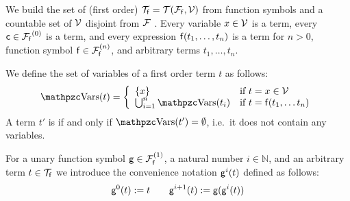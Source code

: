 
\begin{definition}\label{def:terms}
	We build the set of (first order) \( \mcTf = \mcTFfV \)
	from function symbols and a
	countable set of \( \mcV \) disjoint from \( \mcF \) \!.
	Every variable \( x\in\mcV \) is a term,
	every  \( \mc\in\mcFf^{(0)} \) is a term,
	and every expression \( \mf(t_1,\ldots,t_n) \) is a term
	for \( n>0 \), function symbol \( \mf\in\mcFfn \),
	and arbitrary terms \( t_1,\ldots,t_n \).
\end{definition}

\begin{definition}\label{def:term:vars}\label{def:term:ground}
	We define the set of variables of a first order term \( t \) as follows:
	\begin{gather*}
	\MDEFINE{\var(t)}{ll}{
		\{ x \} & \text{if } t = x \in \mcV \\
		\bigcup_{i=1}^n \var(t_i) & \text{if }  t = \mf(t_1, \ldots t_n)
	}
	\end{gather*}
	A term \( t' \) is  if and only if \( \var(t') = \emptyset \),
	i.e.~it does not contain any variables.
\end{definition}

\begin{definition}\label{def:unary:power}
	For a unary function symbol \( \mg\in\mcFfn[1] \), a natural number
	\( i\in\mathbb{N} \), and an arbitrary term \( t\in\mcTf \) we introduce the convenience notation \( \mg^i(t) \) defined as follows:
	\[
	\mg^0(t) := t \qquad
	\mg^{i+1}(t) := \mg(\mg^i(t))
	\]
\end{definition}
